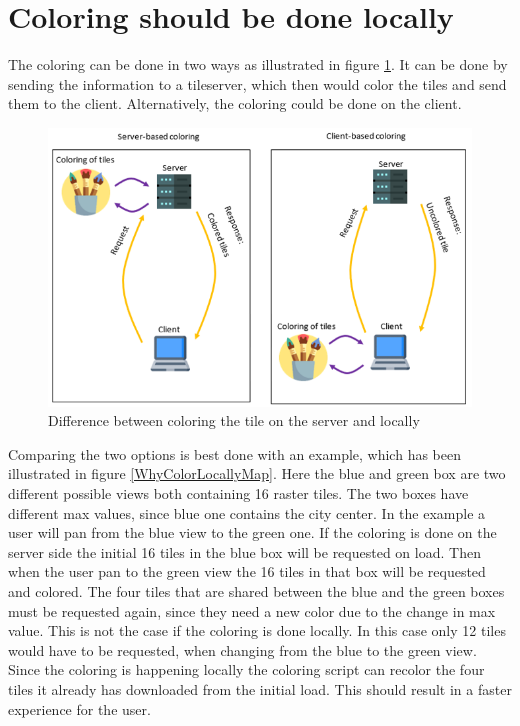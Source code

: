 \section{Coloring should be done locally}
The coloring can be done in two ways as illustrated in figure \ref{WhyColorLocally}. It can be done by sending the information to a tileserver, which then would color the tiles and send them to the client. Alternatively, the coloring could be done on the client. 
 
 \begin{figure} [H]
 	\centering
 	\includegraphics[width=.8\textwidth]{Pictures/WhyColorLocally}
 	\caption{Difference between coloring the tile on the server and locally}
 	\label{WhyColorLocally}
 \end{figure}
 
Comparing the two options is best done with an example, which has been illustrated in figure \ref{WhyColorLocallyMap}. Here the blue and green box are two different possible views both containing 16 raster tiles. The two boxes have different max values, since blue one contains the city center. In the example a user will pan from the blue view to the green one. If the coloring is done on the server side the initial 16 tiles in the blue box will be requested on load. Then when the user pan to the green view the 16 tiles in that box will be requested and colored. The four tiles that are shared between the blue and the green boxes must be requested again, since they need a new color due to the change in max value. This is not the case if the coloring is done locally. In this case only 12 tiles would have to be requested, when changing from the blue to the green view. Since the coloring is happening locally the coloring script can recolor the four tiles it already has downloaded from the initial load. This should result in a faster experience for the user.
   
